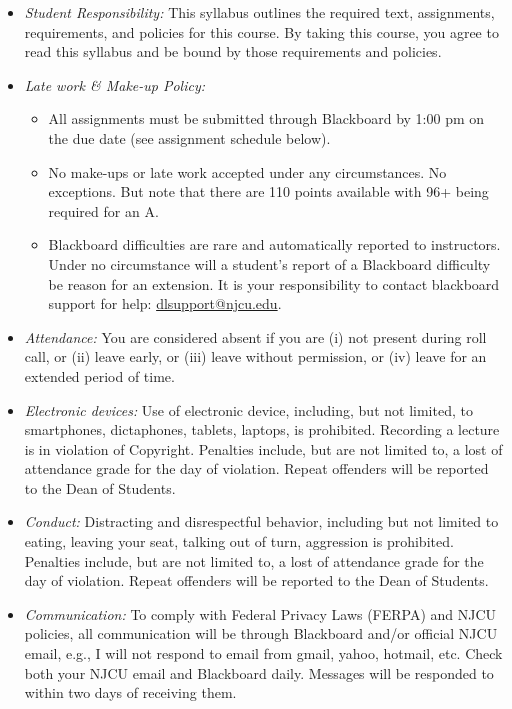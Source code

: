 \documentclass[11pt,article,oneside]{memoir}
\begin{document}
\begin{itemize}

\item \textit{Student Responsibility:} This syllabus outlines the required text, assignments, requirements, and policies for this course. By taking this course, you agree to read this syllabus and be bound by those requirements and policies. 

\item \textit{Late work \& Make-up Policy:} 
\begin{itemize}
\item All assignments must be submitted through Blackboard by 1:00 pm on the due date (see assignment schedule below).
\item  No make-ups or late work accepted under any circumstances. No exceptions. But note that there are 110 points available with 96+ being required for an A.
\item Blackboard difficulties are rare and automatically reported to instructors. Under no circumstance will a student's report of a Blackboard difficulty be reason for an extension. It is your responsibility to contact blackboard support for help: \href{dlsupport@njcu.edu}{dlsupport@njcu.edu}. 

\end{itemize}

\item \textit{Attendance:} You are considered absent if you are (i) not present during roll call, or (ii) leave early, or (iii) leave without permission, or (iv) leave for an extended period of time.

\item \textit{Electronic devices:} Use of electronic device, including, but not limited, to smartphones, dictaphones, tablets, laptops, is prohibited. Recording a lecture is in violation of Copyright. Penalties include, but are not limited to, a lost of attendance grade for the day of violation. Repeat offenders will be reported to the Dean of Students. 

\item \textit{Conduct:} Distracting and disrespectful behavior, including but not limited to eating, leaving your seat, talking out of turn, aggression is prohibited. Penalties include, but are not limited to, a lost of attendance grade for the day of violation. Repeat offenders will be reported to the Dean of Students. 

\item \textit{Communication:} To comply with Federal Privacy Laws (FERPA) and NJCU policies, all communication will be through Blackboard and/or official NJCU email, e.g., I will not respond to email from gmail, yahoo, hotmail, etc. Check both your NJCU email and Blackboard daily. Messages will be responded to within two days of receiving them. 


\end{itemize}
\end{document}
